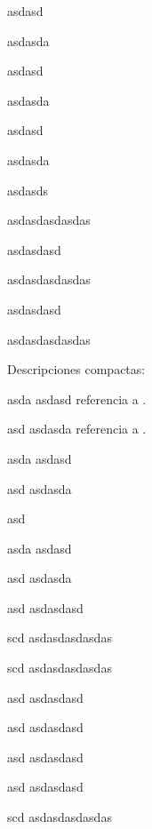 \documentclass[10pt]{book}
\begin{document}
\begin{Cenumerate}
	\item asdasd
	\item asdasda
    \begin{Cenumerate}
    	\item asdasd
    	\item asdasda
        \begin{Cenumerate}
        	\item asdasd
        	\item asdasda
        	\item asdasds 
        	\item asdasdasdasdas
        \end{Cenumerate}
    	\item asdasdasd
    	\item asdasdasdasdas
    \end{Cenumerate}
	\item asdasdasd
	\item asdasdasdasdas
\end{Cenumerate}

Descripciones compactas:
\begin{Cdescription}
	\item[asda] asdasd referencia a .
	\item[asd] asdasda referencia a .
    \begin{Cdescription}
    	\item[asda] asdasd
    	\item[asd] asdasda
    	\item[asd] \cdtEmpty
        \begin{Cdescription}
        	\item[asda] asdasd
        	\item[asd] asdasda
        	\item[asd] asdasdasd
        	\item[scd] asdasdasdasdas
        \end{Cdescription}
    	\item[scd] asdasdasdasdas
    \end{Cdescription}
	\item[asd] asdasdasd 
	\item[asd] asdasdasd 
	\item[asd] asdasdasd 
	\item[asd] asdasdasd 
	\item[scd] asdasdasdasdas
\end{Cdescription}
\end{document}
